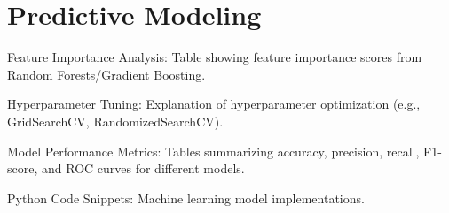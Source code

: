 \chapter{Predictive Modeling}

Feature Importance Analysis: Table showing feature importance scores from Random Forests/Gradient Boosting.

Hyperparameter Tuning: Explanation of hyperparameter optimization (e.g., GridSearchCV, RandomizedSearchCV).

Model Performance Metrics: Tables summarizing accuracy, precision, recall, F1-score, and ROC curves for different models.

Python Code Snippets: Machine learning model implementations.